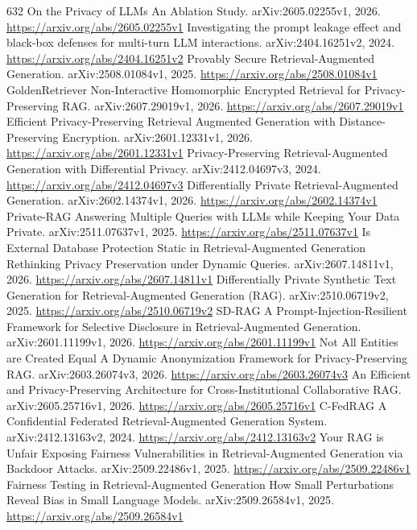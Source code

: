 \documentclass[11pt]{article}
\begin{document}
\begin{thebibliography}{632}
 On the Privacy of LLMs An Ablation Study. arXiv:2605.02255v1, 2026. \url{https://arxiv.org/abs/2605.02255v1}
 Investigating the prompt leakage effect and black-box defenses for multi-turn LLM interactions. arXiv:2404.16251v2, 2024. \url{https://arxiv.org/abs/2404.16251v2}
 Provably Secure Retrieval-Augmented Generation. arXiv:2508.01084v1, 2025. \url{https://arxiv.org/abs/2508.01084v1}
 GoldenRetriever Non-Interactive Homomorphic Encrypted Retrieval for Privacy-Preserving RAG. arXiv:2607.29019v1, 2026. \url{https://arxiv.org/abs/2607.29019v1}
 Efficient Privacy-Preserving Retrieval Augmented Generation with Distance-Preserving Encryption. arXiv:2601.12331v1, 2026. \url{https://arxiv.org/abs/2601.12331v1}
 Privacy-Preserving Retrieval-Augmented Generation with Differential Privacy. arXiv:2412.04697v3, 2024. \url{https://arxiv.org/abs/2412.04697v3}
 Differentially Private Retrieval-Augmented Generation. arXiv:2602.14374v1, 2026. \url{https://arxiv.org/abs/2602.14374v1}
 Private-RAG Answering Multiple Queries with LLMs while Keeping Your Data Private. arXiv:2511.07637v1, 2025. \url{https://arxiv.org/abs/2511.07637v1}
 Is External Database Protection Static in Retrieval-Augmented Generation Rethinking Privacy Preservation under Dynamic Queries. arXiv:2607.14811v1, 2026. \url{https://arxiv.org/abs/2607.14811v1}
 Differentially Private Synthetic Text Generation for Retrieval-Augmented Generation (RAG). arXiv:2510.06719v2, 2025. \url{https://arxiv.org/abs/2510.06719v2}
 SD-RAG A Prompt-Injection-Resilient Framework for Selective Disclosure in Retrieval-Augmented Generation. arXiv:2601.11199v1, 2026. \url{https://arxiv.org/abs/2601.11199v1}
 Not All Entities are Created Equal A Dynamic Anonymization Framework for Privacy-Preserving RAG. arXiv:2603.26074v3, 2026. \url{https://arxiv.org/abs/2603.26074v3}
 An Efficient and Privacy-Preserving Architecture for Cross-Institutional Collaborative RAG. arXiv:2605.25716v1, 2026. \url{https://arxiv.org/abs/2605.25716v1}
 C-FedRAG A Confidential Federated Retrieval-Augmented Generation System. arXiv:2412.13163v2, 2024. \url{https://arxiv.org/abs/2412.13163v2}
 Your RAG is Unfair Exposing Fairness Vulnerabilities in Retrieval-Augmented Generation via Backdoor Attacks. arXiv:2509.22486v1, 2025. \url{https://arxiv.org/abs/2509.22486v1}
 Fairness Testing in Retrieval-Augmented Generation How Small Perturbations Reveal Bias in Small Language Models. arXiv:2509.26584v1, 2025. \url{https://arxiv.org/abs/2509.26584v1}

\end{thebibliography}
\end{document}
